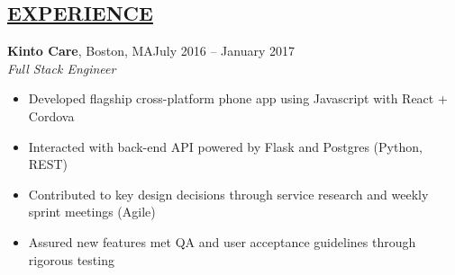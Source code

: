 \documentclass[overlapped,line]{res}
\begin{document}
\begin{resume}
\section{\underline{EXPERIENCE}}

\textbf{Kinto Care}, Boston, MA\hfill July 2016 \--- January 2017\\
{\sl Full Stack Engineer}
\begin{itemize} \itemsep -2pt
\item Developed flagship cross-platform phone app using Javascript with React + Cordova
\item Interacted with back-end API powered by Flask and Postgres (Python, REST)
\item Contributed to key design decisions through service research and weekly sprint meetings (Agile)
\item Assured new features met QA and user acceptance guidelines through rigorous testing 
\end{itemize}



\end{resume}
\end{document}
